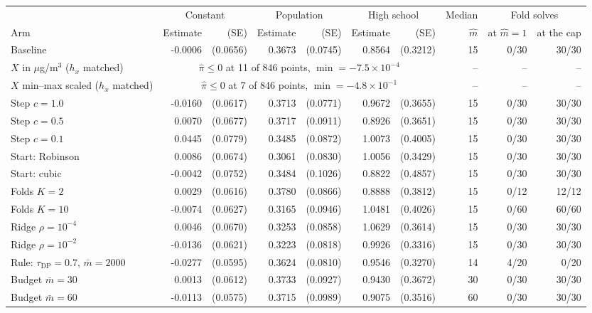 \begin{tabular}{lrrrrrrrrr}
\toprule
& \multicolumn{2}{c}{Constant} & \multicolumn{2}{c}{Population} & \multicolumn{2}{c}{High school} & Median & \multicolumn{2}{c}{Fold solves} \\
\cmidrule(lr){2-3} \cmidrule(lr){4-5} \cmidrule(lr){6-7} \cmidrule(lr){9-10}
Arm & Estimate & (SE) & Estimate & (SE) & Estimate & (SE) & $\hat m$ & at $\hat m = 1$ & at the cap \\
\midrule
Baseline & -0.0006 & (0.0656) & 0.3673 & (0.0745) & 0.8564 & (0.3212) & 15 & 0/30 & 30/30 \\
$X$ in $\mu$g/m$^3$ ($h_x$ matched) & \multicolumn{6}{c}{$\hat\pi \leq 0$ at 11 of 846 points, $\min = -7.5 \times 10^{-4}$} & -- & -- & -- \\
$X$ min--max scaled ($h_x$ matched) & \multicolumn{6}{c}{$\hat\pi \leq 0$ at 7 of 846 points, $\min = -4.8 \times 10^{-1}$} & -- & -- & -- \\
Step $c = 1.0$ & -0.0160 & (0.0617) & 0.3713 & (0.0771) & 0.9672 & (0.3655) & 15 & 0/30 & 30/30 \\
Step $c = 0.5$ & 0.0070 & (0.0677) & 0.3717 & (0.0911) & 0.8926 & (0.3651) & 15 & 0/30 & 30/30 \\
Step $c = 0.1$ & 0.0445 & (0.0779) & 0.3485 & (0.0872) & 1.0073 & (0.4005) & 15 & 0/30 & 30/30 \\
Start: Robinson & 0.0086 & (0.0674) & 0.3061 & (0.0830) & 1.0056 & (0.3429) & 15 & 0/30 & 30/30 \\
Start: cubic & -0.0042 & (0.0752) & 0.3484 & (0.1026) & 0.8822 & (0.4857) & 15 & 0/30 & 30/30 \\
Folds $K = 2$ & 0.0029 & (0.0616) & 0.3780 & (0.0866) & 0.8888 & (0.3812) & 15 & 0/12 & 12/12 \\
Folds $K = 10$ & -0.0074 & (0.0627) & 0.3165 & (0.0946) & 1.0481 & (0.4026) & 15 & 0/60 & 60/60 \\
Ridge $\rho = 10^{-4}$ & 0.0046 & (0.0670) & 0.3253 & (0.0858) & 1.0629 & (0.3614) & 15 & 0/30 & 30/30 \\
Ridge $\rho = 10^{-2}$ & -0.0136 & (0.0621) & 0.3223 & (0.0818) & 0.9926 & (0.3316) & 15 & 0/30 & 30/30 \\
Rule: $\tau_{\mathrm{DP}} = 0.7$, $\bar m = 2000$ & -0.0277 & (0.0595) & 0.3624 & (0.0810) & 0.9546 & (0.3270) & 14 & 4/20 & 0/20 \\
Budget $\bar m = 30$ & 0.0013 & (0.0612) & 0.3733 & (0.0927) & 0.9430 & (0.3672) & 30 & 0/30 & 30/30 \\
Budget $\bar m = 60$ & -0.0113 & (0.0575) & 0.3715 & (0.0989) & 0.9075 & (0.3516) & 60 & 0/30 & 30/30 \\

\end{tabular}
